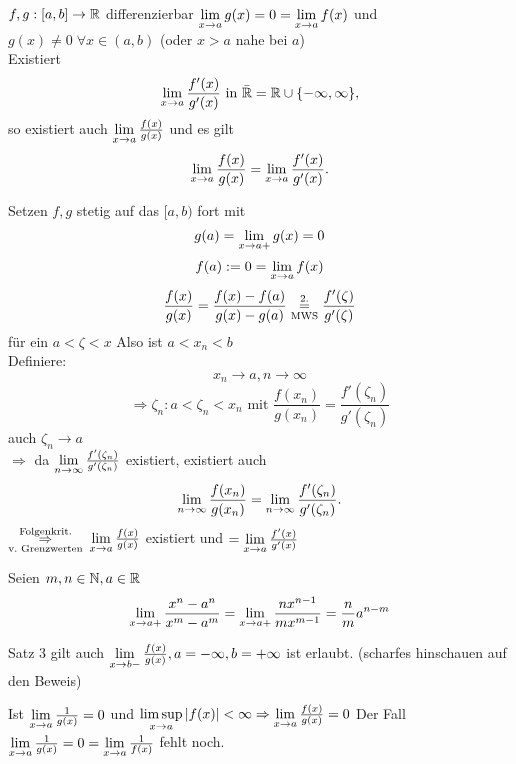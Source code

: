 \documentclass[../ana2.tex]{subfiles}
\begin{document}
\begin{satz}
    \( f,g:[a,b]\rightarrow \mathbb{R} \) differenzierbar
    \( \lim\limits_{x\rightarrow{}a}g(x) = 0 = \lim\limits_{x\rightarrow{}a}f(x) \) und
    \( g(x) \neq 0 \; \forall x \in (a,b) \) (oder \( x > a \) nahe bei \(a\)) \\
    Existiert
    \[ \lim\limits_{x\rightarrow{}a} \frac{f'(x)}{g'(x)} 
    \text{ in } \bar{\mathbb{R}} = \mathbb{R} \cup \{-\infty, \infty\}, \]
    so existiert auch \( \lim\limits_{x\rightarrow{}a} \frac{f(x)}{g(x)} \)
    und es gilt
    \[ \lim\limits_{x\rightarrow{}a} \frac{f(x)}{g(x)} 
    = \lim\limits_{x\rightarrow{}a} \frac{f'(x)}{g'(x)}. \]
\end{satz}
\begin{bew}
    Setzen \(f,g\) stetig auf das \( [a,b) \) fort mit
    \[ g(a) = \lim\limits_{x\rightarrow{}a+} g(x) = 0 \]
    \[ f(a) := 0 = \lim\limits_{x\rightarrow{}a} f(x) \]
    \[ \frac{f(x)}{g(x)} = \frac{f(x) -f(a)}{g(x)-g(a)} 
    \overset{\text{2.}}{\underset{\text{MWS}}{=}} \frac{f'(\zeta)}{g'(\zeta)} \]
    für ein \( a < \zeta < x \)
    Also ist \( a < x_n < b \) \\
    Definiere: 
    \[ x_n \rightarrow a, n \rightarrow \infty \]
    \[ \Rightarrow \zeta_n : a < \zeta_n < x_n \text{ mit } 
    \frac{ f(x_n) }{ g(x_n) } 
    = \frac{ f'(\zeta_n) }{ g'(\zeta_n) } \]
    auch \( \zeta_n \rightarrow a \) \\
    \( \Rightarrow \) da \( \lim\limits_{n\rightarrow\infty} 
    \frac{f'(\zeta_n)}{g'(\zeta_n)} \) existiert, existiert 
    auch 
    \[ \lim\limits_{n\rightarrow\infty} \frac{f(x_n)}{g(x_n)} = \lim\limits_{n\rightarrow\infty} 
    \frac{f'(\zeta_n)}{g'(\zeta_n)}. \]
    \( \overundersett{Folgenkrit.}{v.\ Grenzwerten}{\Rightarrow} \)
    \( \lim\limits_{x\rightarrow{}a} \frac{f(x)}{g(x)} \) existiert und 
    \( = \lim\limits_{x\rightarrow{}a} \frac{f'(x)}{g'(x)} \)
\end{bew}
\begin{bsp}
    Seien \(m,n \in \mathbb{N}, a \in \mathbb{R} \)
    \[ \lim\limits_{x\rightarrow{}a+} \frac{x^n -a^n}{x^m-a^m} =    
    \lim\limits_{x\rightarrow{}a+} \frac{nx^{n-1}}{mx^{m-1}} 
    = \frac{n}{m}a^{n-m} \]    
\end{bsp}
\begin{bem}
    Satz 3 gilt auch \( \lim\limits_{x\rightarrow{}b-} \frac{f(x)}{g(x)},
    a=-\infty, b=+\infty \) ist erlaubt. (scharfes hinschauen
    auf den Beweis)
\end{bem}
\begin{bem}
    Ist \( \lim\limits_{x\rightarrow{}a} \frac{1}{g(x)} = 0 \) und \( \limsup\limits_{x\rightarrow{}a}
    \left|f(x)\right| < \infty \Rightarrow \lim\limits_{x\rightarrow{}a} \frac{f(x)}{g(x)} = 0 \)
    Der Fall \( \lim\limits_{x\rightarrow{}a} \frac{1}{g(x)} = 0 
    = \lim\limits_{x\rightarrow{}a} \frac{1}{f(x)} \) fehlt noch.
\end{bem}
\end{document}
